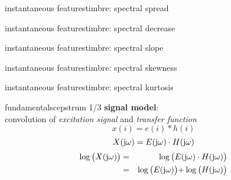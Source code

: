         \begin{frame}{instantaneous features}{timbre: spectral spread}
        \end{frame}
        \begin{frame}{instantaneous features}{timbre: spectral decrease}
        \end{frame}
        \begin{frame}{instantaneous features}{timbre: spectral slope}
        \end{frame}
        \begin{frame}{instantaneous features}{timbre: spectral skewness}
        \end{frame}
        \begin{frame}{instantaneous features}{timbre: spectral kurtosis}
        \end{frame}

		\begin{frame}{fundamentals}{cepstrum 1/3}
			\textbf{signal model}: \\
			convolution of \textit{excitation signal} and \textit{transfer function}
			\begin{equation*}\label{eq:speech}
				x(i) = e(i)\ast h(i)
			\end{equation*}
			\pause
			\begin{equation*}
				X(\mathrm{j}\omega) = E(\mathrm{j}\omega)\cdot H(\mathrm{j}\omega) 
			\end{equation*}
			\pause
			\begin{eqnarray*}
				\log\big(X(\mathrm{j}\omega)\big)	&=& \log\big(E(\mathrm{j}\omega)\cdot H(\mathrm{j}\omega)\big)\nonumber\\
											&=& \log\big(E(\mathrm{j}\omega)\big) \mathbf{+} \log\big(H(\mathrm{j}\omega)\big) 
			\end{eqnarray*}
		\end{frame}

